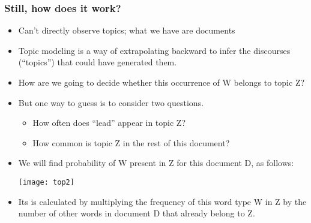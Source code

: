 \begin{frame}[fragile]\frametitle{Still, how does it work?}
  \begin{itemize}
  	\item Can't directly observe topics; what we have are documents
	\item Topic modeling is a way of extrapolating backward to infer the discourses (``topics'') that could have generated them.
	\item How are we going to decide whether this occurrence of W belongs to topic Z?
%
	\item But one way to guess is to consider two questions.
	  \begin{itemize}
	\item How often does ``lead'' appear in topic Z? 
	\item How common is topic Z in the rest of this document? 
	  \end{itemize}
	\item We will find probability of W present in Z for this document D, as follows:
\begin{center}
\texttt{[image: top2]}
\end{center}
	\item Its is calculated by multiplying the frequency of this word type W in Z by the number of other words in document D that already belong to Z. 
  \end{itemize}
\end{frame}


